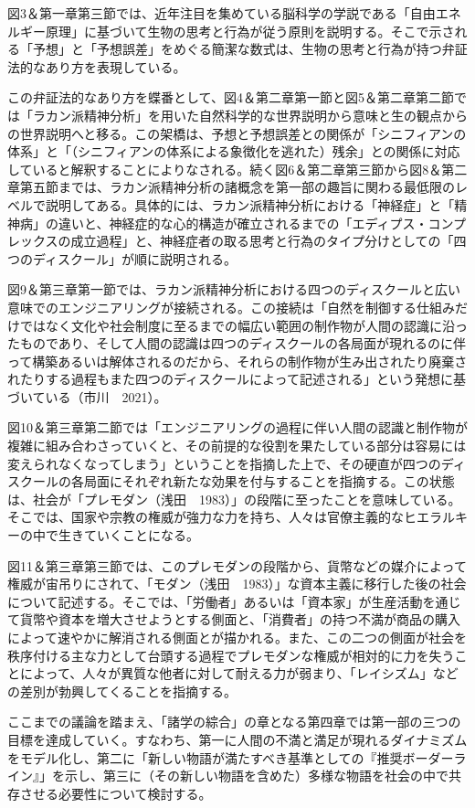 図3＆第一章第三節では、近年注目を集めている脳科学の学説である「自由エネルギー原理」に基づいて生物の思考と行為が従う原則を説明する。そこで示される「予想」と「予想誤差」をめぐる簡潔な数式は、生物の思考と行為が持つ弁証法的なあり方を表現している。

この弁証法的なあり方を蝶番として、図4＆第二章第一節と図5＆第二章第二節では「ラカン派精神分析」を用いた自然科学的な世界説明から意味と生の観点からの世界説明へと移る。この架橋は、予想と予想誤差との関係が「シニフィアンの体系」と「（シニフィアンの体系による象徴化を逃れた）残余」との関係に対応していると解釈することによりなされる。続く図6＆第二章第三節から図8＆第二章第五節までは、ラカン派精神分析の諸概念を第一部の趣旨に関わる最低限のレベルで説明してある。具体的には、ラカン派精神分析における「神経症」と「精神病」の違いと、神経症的な心的構造が確立されるまでの「エディプス・コンプレックスの成立過程」と、神経症者の取る思考と行為のタイプ分けとしての「四つのディスクール」が順に説明される。

図9＆第三章第一節では、ラカン派精神分析における四つのディスクールと広い意味でのエンジニアリングが接続される。この接続は「自然を制御する仕組みだけではなく文化や社会制度に至るまでの幅広い範囲の制作物が人間の認識に沿ったものであり、そして人間の認識は四つのディスクールの各局面が現れるのに伴って構築あるいは解体されるのだから、それらの制作物が生み出されたり廃棄されたりする過程もまた四つのディスクールによって記述される」という発想に基づいている（市川　2021）\cite{Ichikawa}。

図10＆第三章第二節では「エンジニアリングの過程に伴い人間の認識と制作物が複雑に組み合わさっていくと、その前提的な役割を果たしている部分は容易には変えられなくなってしまう」ということを指摘した上で、その硬直が四つのディスクールの各局面にそれぞれ新たな効果を付与することを指摘する。この状態は、社会が「プレモダン（浅田　1983）\cite{Asada}」の段階に至ったことを意味している。そこでは、国家や宗教の権威が強力な力を持ち、人々は官僚主義的なヒエラルキーの中で生きていくことになる。

図11＆第三章第三節では、このプレモダンの段階から、貨幣などの媒介によって権威が宙吊りにされて、「モダン（浅田　1983）\cite{Asada}」な資本主義に移行した後の社会について記述する。そこでは、「労働者」あるいは「資本家」が生産活動を通じて貨幣や資本を増大させようとする側面と、「消費者」の持つ不満が商品の購入によって速やかに解消される側面とが描かれる。また、この二つの側面が社会を秩序付ける主な力として台頭する過程でプレモダンな権威が相対的に力を失うことによって、人々が異質な他者に対して耐える力が弱まり、「レイシズム」などの差別が勃興してくることを指摘する。

ここまでの議論を踏まえ、「諸学の綜合」の章となる第四章では第一部の三つの目標を達成していく。すなわち、第一に人間の不満と満足が現れるダイナミズムをモデル化し、第二に「新しい物語が満たすべき基準としての『推奨ボーダーライン』」を示し、第三に（その新しい物語を含めた）多様な物語を社会の中で共存させる必要性について検討する。
